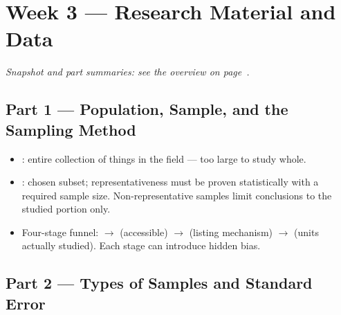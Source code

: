 \documentclass[../main.tex]{subfiles}
\begin{document}
\setlength{\parskip}{3pt}

\chapter{Week 3 — Research Material and Data}
\label{ch:week3}

\textit{Snapshot and part summaries: see the overview on page~\pageref{ov:week3}.}

\section{Part 1 — Population, Sample, and the Sampling Method}
\label{sec:sampling}

\begin{itemize}
  \item {}: entire collection of things in the field — too large to study whole.
  \item {}: chosen subset; representativeness must be proven statistically with a required sample size. Non-representative samples limit conclusions to the studied portion only.
  \item Four-stage funnel:  $\to$  (accessible) $\to$  (listing mechanism) $\to$  (units actually studied). Each stage can introduce hidden bias.
\end{itemize}

\section{Part 2 — Types of Samples and Standard Error}
\label{sec:sample-types}
\end{document}
